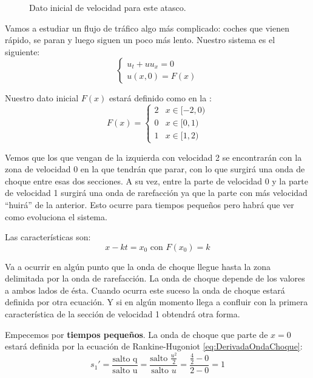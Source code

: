 		\begin{example}[Zona central de atasco]

			\begin{wrapfigure}[8]{R}{0.4\textwidth}
				\centering
				\caption{Dato inicial de velocidad para este atasco.}
				\label{fig:FTresVelocidades}
			\end{wrapfigure}

			Vamos a estudiar un flujo de tráfico algo más complicado: coches que vienen rápido, se paran y luego siguen un poco más lento. Nuestro sistema es el siguiente: \[
				\begin{cases}
					u_t + u u_x = 0 \\
					u(x,0) = F(x)
				\end{cases}
			\]

			Nuestro dato inicial $F(x)$ estará definido como en la : \[
				F(x) = \begin{cases}
					2 & x ∈ [-2, 0) \\
					0 & x ∈ [0, 1) \\
					1 & x ∈ [1, 2)
				\end{cases}
			\]




			Vemos que los que vengan de la izquierda con velocidad 2 se encontrarán con la zona de velocidad 0 en la que tendrán que parar, con lo que surgirá una onda de choque entre esas dos secciones. A su vez, entre la parte de velocidad 0 y la parte de velocidad 1 surgirá una onda de rarefacción ya que la parte con más velocidad ``huirá'' de la anterior. Esto ocurre para tiempos pequeños pero habrá que ver como evoluciona el sistema.

			Las características son:
			\[ x - kt = x_0 \text{ con } F(x_0) = k \]

			Va a ocurrir en algún punto que la onda de choque llegue hasta la zona delimitada por la onda de rarefacción. La onda de choque depende de los valores a ambos lados de ésta. Cuando ocurra este suceso la onda de choque estará definida por otra ecuación. Y si en algún momento llega a confluir con la primera característica de la sección de velocidad 1 obtendrá otra forma.


			Empecemos por \textbf{tiempos pequeños}. La onda de choque que parte de $x=0$ estará definida por la ecuación de Rankine-Hugoniot \eqref{eq:DerivadaOndaChoque}:
			\[ s_1' = \frac{\text{salto q}}{\text{salto u}} = \frac{\text{salto }\frac{u^2}{2}}{\text{salto }u} = \frac{\frac{4}{2} - 0}{2-0} = 1 \]


\end{example}
